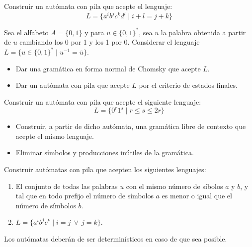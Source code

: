 \begin{ejercicio}\label{ej:1.5.9}
    Construir un autómata con pila que acepte el lenguaje:
    \begin{equation*}
        L = \{a^i b^j c^k d^l \mid i+l = j+k\}
    \end{equation*}
\end{ejercicio}

\begin{ejercicio}\label{ej:1.5.10}
    Sea el alfabeto $A = \{0,1\}$ y para $u\in {\{0,1\}}^{\ast}$, sea $\overline{u}$ la palabra obtenida a partir de $u$ cambiando los 0 por 1 y los 1 por 0. Considerar el lenguaje $L = \{u\in {\{0,1\}}^{\ast} \mid u^{-1} = \overline{u}\}$.
    \begin{itemize}
        \item Dar una gramática en forma normal de Chomsky que acepte $L$.
        \item Dar un autómata con pila que acepte $L$ por el criterio de estados finales.
    \end{itemize}
\end{ejercicio}

\begin{ejercicio}\label{ej:1.5.11}
    Construir un autómata con pila que acepte el siguiente lenguaje:
    \begin{equation*}
        L = \{0^r 1^s \mid r\leq s \leq 2r\}
    \end{equation*}
    \begin{itemize}
        \item Construir, a partir de dicho autómata, una gramática libre de contexto que acepte el mismo lenguaje.
        \item Eliminar símbolos y producciones inútiles de la gramática.
    \end{itemize}
\end{ejercicio}

\begin{ejercicio}\label{ej:1.5.12}
    Construir autómatas con pila que acepten los siguientes lenguajes:
    \begin{enumerate}[label=\alph*)]
        \item El conjunto de todas las palabras $u$ con el mismo número de síbolos $a$ y $b$, y tal que en todo prefijo el número de símbolos $a$ es menor o igual que el número de símbolos $b$.
        \item $L = \{a^i b^j c^k \mid i=j\ \lor\ j = k\}$.
    \end{enumerate}
    Los autómatas deberán de ser determinísticos en caso de que sea posible.
\end{ejercicio}

